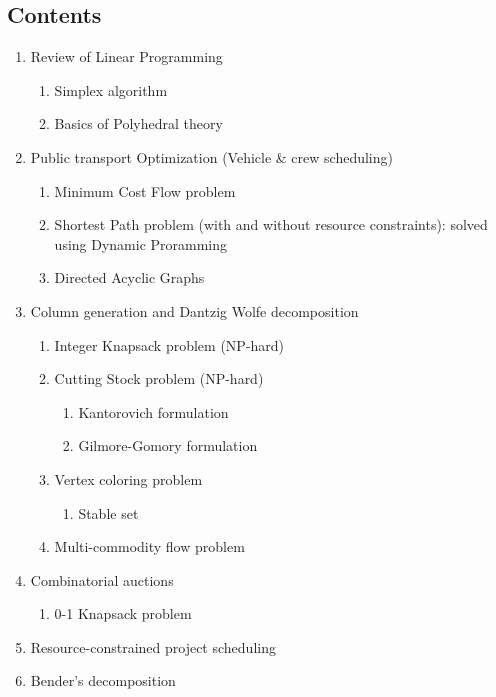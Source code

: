 \documentclass{article}
\begin{document}
\subsection*{Contents}
\begin{enumerate}
    \item Review of Linear Programming
    \begin{enumerate}
        \item Simplex algorithm
        \item Basics of Polyhedral theory
    \end{enumerate}
    \item Public transport Optimization (Vehicle \& crew scheduling)
    \begin{enumerate}
        \item Minimum Cost Flow problem
        \item Shortest Path problem (with and without resource constraints): solved using Dynamic Proramming
        \item Directed Acyclic Graphs
    \end{enumerate}
    \item Column generation and Dantzig Wolfe decomposition
    \begin{enumerate}
        \item Integer Knapsack problem (NP-hard)
        \item Cutting Stock problem (NP-hard)
        \begin{enumerate}
            \item Kantorovich formulation
            \item Gilmore-Gomory formulation 
        \end{enumerate}
        \item Vertex coloring problem
        \begin{enumerate}
            \item Stable set
        \end{enumerate}
        \item Multi-commodity flow problem  
    \end{enumerate}
    \item Combinatorial auctions
    \begin{enumerate}
        \item 0-1 Knapsack problem
    \end{enumerate}
    \item Resource-constrained project scheduling
    \item Bender's decomposition

\end{enumerate}
\end{document}
